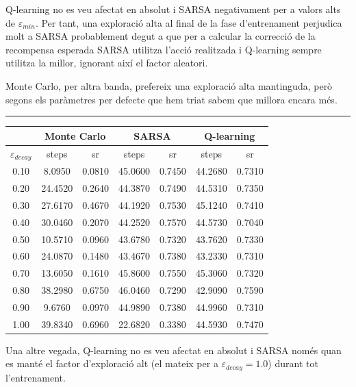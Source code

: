 \documentclass[12pt,a4paper]{report}
\begin{document}
Q-learning no es veu afectat en absolut i SARSA negativament per a valors alts de $\varepsilon_{min}$.
Per tant, una exploració alta al final de la fase d'entrenament perjudica molt a SARSA probablement degut
a que per a calcular la correcció de la recompensa esperada SARSA utilitza l'acció realitzada i Q-learning sempre
utilitza la millor, ignorant així el factor aleatori.

Monte Carlo, per altra banda, prefereix una exploració alta mantinguda, però segons els paràmetres per defecte
que hem triat sabem que millora encara més.

\vspace*{10pt}\hrule

\begin{table}[H]
  \centering
  \begin{tabular}{| c | c c | c c | c c |}
    \hline
      & \multicolumn{2}{|c|}{Monte Carlo} & \multicolumn{2}{|c|}{SARSA} & \multicolumn{2}{|c|}{Q-learning} \\
    \hline
    $\varepsilon_{decay}$ & steps & sr & steps & sr & steps & sr \\
    \hline
    0.10 & 8.0950  & 0.0810 & 45.0600 & 0.7450 & 44.2680 & 0.7310 \\
    0.20 & 24.4520 & 0.2640 & 44.3870 & 0.7490 & 44.5310 & 0.7350 \\
    0.30 & 27.6170 & 0.4670 & 44.1920 & 0.7530 & 45.1240 & 0.7410 \\
    0.40 & 30.0460 & 0.2070 & 44.2520 & 0.7570 & 44.5730 & 0.7040 \\
    0.50 & 10.5710 & 0.0960 & 43.6780 & 0.7320 & 43.7620 & 0.7330 \\
    0.60 & 24.0870 & 0.1480 & 43.4670 & 0.7380 & 43.2330 & 0.7310 \\
    0.70 & 13.6050 & 0.1610 & 45.8600 & 0.7550 & 45.3060 & 0.7320 \\
    0.80 & 38.2980 & 0.6750 & 46.0460 & 0.7290 & 42.9090 & 0.7590 \\
    0.90 & 9.6760  & 0.0970 & 44.9890 & 0.7380 & 44.9960 & 0.7310 \\
    1.00 & 39.8340 & 0.6960 & 22.6820 & 0.3380 & 44.5930 & 0.7470 \\
    \hline
  \end{tabular}
\end{table}

Una altre vegada, Q-learning no es veu afectat en absolut i SARSA només quan es manté el factor d'exploració
alt (el mateix per a $\varepsilon_{decay} = 1.0$) durant tot l'entrenament.
\end{document}
